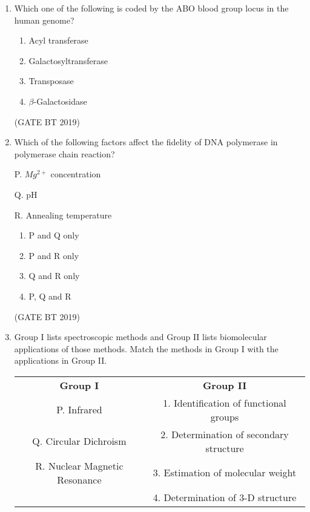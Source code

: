 \documentclass[journal,12pt,onecolumn]{IEEEtran}
\begin{document}
\begin{enumerate}
\begin{multicols}{2}
\begin{enumerate}
\item P, Q and R only
\item Q and R only
\item P, R and S only
\item P and S only
\end{enumerate}
\end{multicols}\hfill(GATE BT 2019)

\item Which one of the following is coded by the ABO blood group locus in the human genome?

\begin{multicols}{2}
\begin{enumerate}
\item Acyl transferase
\item Galactosyltransferase
\item Transposase
\item $\beta$-Galactosidase
\end{enumerate}
\end{multicols}\hfill(GATE BT 2019)


\item Which of the following factors affect the fidelity of DNA polymerase in polymerase chain reaction? 

P. $Mg^{2+}$ concentration 

Q. pH 

R. Annealing temperature

\begin{multicols}{2}
\begin{enumerate}
\item P and Q only
\item P and R only
\item Q and R only
\item P, Q and R
\end{enumerate}
\end{multicols}\hfill(GATE BT 2019)

\item Group I lists spectroscopic methods and Group II lists biomolecular applications of those methods. Match the methods in Group I with the applications in Group II. \\[6pt]

\begin{tabular}{c c}
\textbf{Group I} & \textbf{Group II} \\
P. Infrared & 1. Identification of functional groups \\
Q. Circular Dichroism & 2. Determination of secondary structure \\
R. Nuclear Magnetic Resonance & 3. Estimation of molecular weight \\
 & 4. Determination of 3-D structure \\
\end{tabular}


\end{enumerate}
\end{document}

